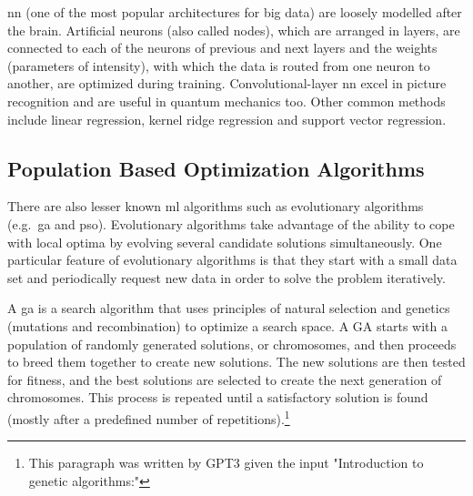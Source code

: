\Gls{nn} (one of the most popular architectures for big data\cite{Chiroma2019}) are loosely modelled after the brain\cite{bishop1994neural}.
Artificial neurons (also called nodes), which are arranged in layers, 
are connected to each of the neurons of previous and next layers
and the weights (parameters of intensity), with which the data is routed from one neuron to another, 
are optimized during training. 
%
Convolutional-layer \gls{nn} excel in picture recognition\cite{Lecun1995conv} and are useful in quantum mechanics too\cite{westermayr2020combining}.
Other common methods include linear regression, kernel ridge regression and support vector regression.



\subsection{Population Based Optimization Algorithms}

There are also lesser known \gls{ml} algorithms such as 
evolutionary algorithms (e.g.\ \gls{ga} and \gls{pso}).
Evolutionary algorithms take advantage of the ability to cope with local optima by evolving several candidate solutions simultaneously\cite{villanova2010function}.
%
One particular feature of evolutionary algorithms is that they start with a small data set
and periodically request new data in order to solve the problem iteratively.

A \gls{ga} is a search algorithm that uses principles of natural selection and genetics (mutations and recombination) to optimize a search space. A GA starts with a population of randomly generated solutions, or chromosomes, and then proceeds to breed them together to create new solutions. The new solutions are then tested for fitness, and the best solutions are selected to create the next generation of chromosomes. This process is repeated until a satisfactory solution is found (mostly after a predefined number of repetitions).\footnote{This paragraph was written by GPT3\cite{Liu2021gpt} given the input "Introduction to genetic algorithms:"}

\iffalse
\Gls{ga} uses a starting population of size $p$ ($p \in$ \td{N$^+$}) where each experiment (or data point) 
is represented by a fixed size genome of 0's and 1's in most cases. 
Each individual is then given a fitness value. 
New genomes are added and discarded from the population using 
selection, mutation and crossover operations.
\fi

